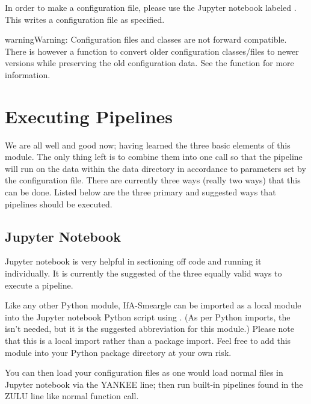 \documentclass[letterpaper,10pt,english]{sphinxmanual}
\begin{document}
In order to make a configuration file, please use the Jupyter notebook labeled
. This writes a configuration file as
specified.

\begin{sphinxadmonition}{warning}{Warning:}
Configuration files and classes are not forward compatible. There
is however a function to convert older configuration classes/files to newer
versions while preserving the old configuration data. See the {\hyperref[\detokenize{python_docstrings/IfA_Smeargle.yankee.yankee_functions:IfA_Smeargle.yankee.yankee_functions.yankee_fast_forward_configuration_class}]{}} function for more information.
\end{sphinxadmonition}


\section{Executing Pipelines}
\label{\detokenize{quickstart:executing-pipelines}}
We are all well and good now; having learned the three basic elements of this
module. The only thing left is to combine them into one call so that the
pipeline will run on the data within the data directory in accordance to
parameters set by the configuration file. There are currently three ways
(really two ways) that this can be done. Listed below are the three primary
and suggested ways that pipelines should be executed.


\subsection{Jupyter Notebook}
\label{\detokenize{quickstart:jupyter-notebook}}
Jupyter notebook is very helpful in sectioning off code and running it
individually. It is currently the suggested of the three equally valid ways
to execute a pipeline.

Like any other Python module, IfA-Smeargle can be imported as a local module
into the Jupyter notebook Python script using .
(As per Python imports, the  isn’t needed, but it is the suggested
abbreviation for this module.) Please note that this is a local import rather
than a package import. Feel free to add this module into your Python package
directory at your own risk.

You can then load your configuration files as one would load normal files in
Jupyter notebook via the YANKEE line; then run built-in pipelines found in the
ZULU line like normal function call.
\end{document}
